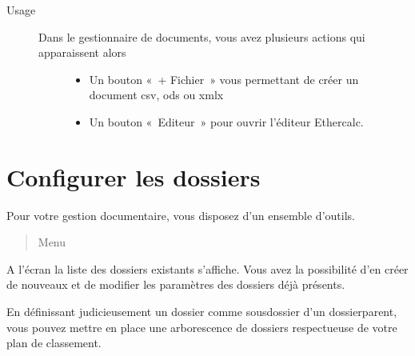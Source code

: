 \documentclass[letterpaper,10pt,french]{sphinxmanual}
\begin{document}
\begin{sphinxVerbatim}[commandchars=\\\{\}]
   
\end{sphinxVerbatim}
\begin{description}
\item[{Usage}] \leavevmode\begin{description}
\item[{Dans le gestionnaire de documents, vous avez plusieurs actions qui apparaissent alors}] \leavevmode\begin{itemize}
\item {} 
Un bouton « + Fichier » vous permettant de créer un document csv, ods ou xmlx

\item {} 
Un bouton « Editeur » pour ouvrir l’éditeur Ethercalc.

\end{itemize}

\end{description}

\end{description}

\noindent{}


\section{Configurer les dossiers}
\label{\detokenize{documents/configuration:configurer-les-dossiers}}\label{\detokenize{documents/configuration::doc}}
Pour votre gestion documentaire, vous disposez d’un ensemble d’outils.
\begin{quote}

Menu 
\end{quote}

A l’écran la liste des dossiers existants s’affiche. Vous avez la possibilité d’en créer de nouveaux et de modifier les paramètres des dossiers déjà présents.

\noindent{}

En définissant judicieusement un dossier comme sous\sphinxhyphen{}dossier d’un dossier\sphinxhyphen{}parent, vous pouvez  mettre en place une arborescence de dossiers respectueuse de votre plan de classement.
\end{document}
